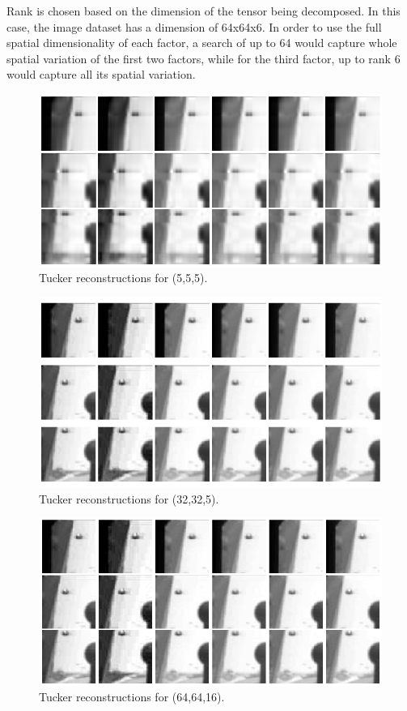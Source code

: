 \documentclass[11pt]{article}
\begin{document}
Rank is chosen based on the dimension of the tensor being decomposed. In this case, the image dataset has a dimension of 64x64x6. In order to use the full spatial dimensionality of each factor, a search of up to 64 would capture whole spatial variation of the first two factors, while for the third factor, up to rank 6 would capture all its spatial variation.

\begin{figure}[H]
  \centering
  \includegraphics[width=\linewidth]{Tucker rank 5 5 5.png}
  \caption{Tucker reconstructions for (5,5,5).}
  \label{fig:tucker-rank-visuals}
\end{figure}

\begin{figure}[H]
  \centering
  \includegraphics[width=\linewidth]{Tucker rank 32 32 5.png}
  \caption{Tucker reconstructions for (32,32,5).}
  \label{fig:tucker-rank-visuals}
\end{figure}

\begin{figure}[H]
  \centering
  \includegraphics[width=\linewidth]{Tucker rank 64 64 16.png}
  \caption{Tucker reconstructions for (64,64,16).}
  \label{fig:tucker-rank-visuals}
\end{figure}
\end{document}
